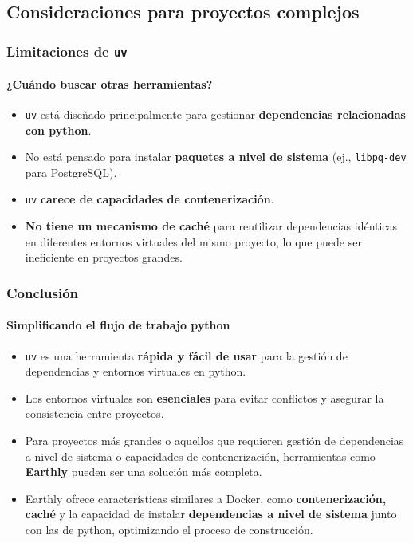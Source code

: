 \documentclass{beamer}
\begin{document}
\subsection{Consideraciones para proyectos complejos}
\frame
{
    \frametitle{Limitaciones de \texttt{uv}}
    \framesubtitle{¿Cuándo buscar otras herramientas?}
    \begin{itemize}
        \item \texttt{uv} está diseñado principalmente para gestionar \textbf{dependencias relacionadas con python}.
        \item No está pensado para instalar \textbf{paquetes a nivel de sistema} (ej., \texttt{libpq-dev} para PostgreSQL).
        \item \texttt{uv} \textbf{carece de capacidades de contenerización}.
        \item \textbf{No tiene un mecanismo de caché} para reutilizar dependencias idénticas en diferentes entornos virtuales del mismo proyecto, lo que puede ser ineficiente en proyectos grandes.
    \end{itemize}
}

\frame
{
    \frametitle{Conclusión}
    \framesubtitle{Simplificando el flujo de trabajo python}
    \begin{itemize}
        \item \texttt{uv} es una herramienta \textbf{rápida y fácil de usar} para la gestión de dependencias y entornos virtuales en python.
        \item Los entornos virtuales son \textbf{esenciales} para evitar conflictos y asegurar la consistencia entre proyectos.
        \item Para proyectos más grandes o aquellos que requieren gestión de dependencias a nivel de sistema o capacidades de contenerización, herramientas como \textbf{Earthly} pueden ser una solución más completa.
        \item Earthly ofrece características similares a Docker, como \textbf{contenerización, caché} y la capacidad de instalar \textbf{dependencias a nivel de sistema} junto con las de python, optimizando el proceso de construcción.
    \end{itemize}
}
\end{document}

